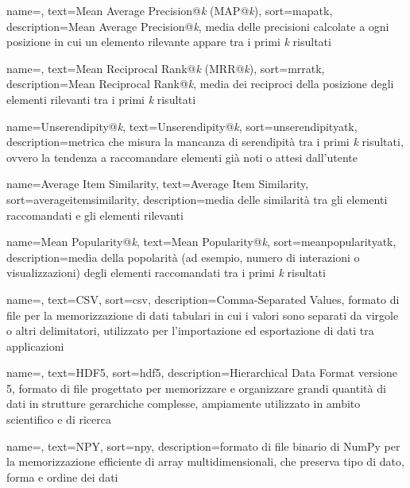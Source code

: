  {
    name=,
    text=Mean Average Precision@\emph{k} (MAP@\emph{k}),
    sort=mapatk,
    description={Mean Average Precision@\emph{k}, media delle precisioni calcolate a ogni posizione in cui un elemento rilevante appare tra i primi \emph{k} risultati}
}

 {
    name=,
    text=Mean Reciprocal Rank@\emph{k} (MRR@\emph{k}),
    sort=mrratk,
    description={Mean Reciprocal Rank@\emph{k}, media dei reciproci della posizione degli elementi rilevanti tra i primi \emph{k} risultati}
}

 {
    name=Unserendipity@\emph{k},
    text=Unserendipity@\emph{k},
    sort=unserendipityatk,
    description={metrica che misura la mancanza di serendipità tra i primi \emph{k} risultati, ovvero la tendenza a raccomandare elementi già noti o attesi dall'utente}
}

 {
    name=Average Item Similarity,
    text=Average Item Similarity,
    sort=averageitemsimilarity,
    description={media delle similarità tra gli elementi raccomandati e gli elementi rilevanti}
}

 {
    name=Mean Popularity@\emph{k},
    text=Mean Popularity@\emph{k},
    sort=meanpopularityatk,
    description={media della popolarità (ad esempio, numero di interazioni o visualizzazioni) degli elementi raccomandati tra i primi \emph{k} risultati}
}

 {
    name=,
    text=CSV,
    sort=csv,
    description={Comma-Separated Values, formato di file per la memorizzazione di dati tabulari in cui i valori sono separati da virgole o altri delimitatori, utilizzato per l'importazione ed esportazione di dati tra applicazioni}
}

 {
    name=,
    text=HDF5,
    sort=hdf5,
    description={Hierarchical Data Format versione 5, formato di file progettato per memorizzare e organizzare grandi quantità di dati in strutture gerarchiche complesse, ampiamente utilizzato in ambito scientifico e di ricerca}
}

 {
    name=,
    text=NPY,
    sort=npy,
    description={formato di file binario di NumPy per la memorizzazione efficiente di array multidimensionali, che preserva tipo di dato, forma e ordine dei dati}
}

